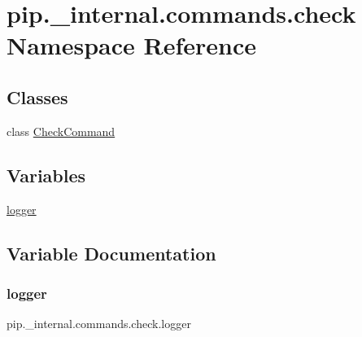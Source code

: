 \hypertarget{namespacepip_1_1__internal_1_1commands_1_1check}{}\section{pip.\+\_\+internal.\+commands.\+check Namespace Reference}
\label{namespacepip_1_1__internal_1_1commands_1_1check}
\subsection*{Classes}
\begin{DoxyCompactItemize}
\item 
class \hyperlink{classpip_1_1__internal_1_1commands_1_1check_1_1CheckCommand}{Check\+Command}
\end{DoxyCompactItemize}
\subsection*{Variables}
\begin{DoxyCompactItemize}
\item 
\hyperlink{namespacepip_1_1__internal_1_1commands_1_1check_affe47121b2ae459aed7a8bfc14459c81}{logger}
\end{DoxyCompactItemize}


\subsection{Variable Documentation}
\mbox{\label{namespacepip_1_1__internal_1_1commands_1_1check_affe47121b2ae459aed7a8bfc14459c81}} 
\subsubsection{\texorpdfstring{logger}{logger}}
{\footnotesize\ttfamily pip.\+\_\+internal.\+commands.\+check.\+logger}

